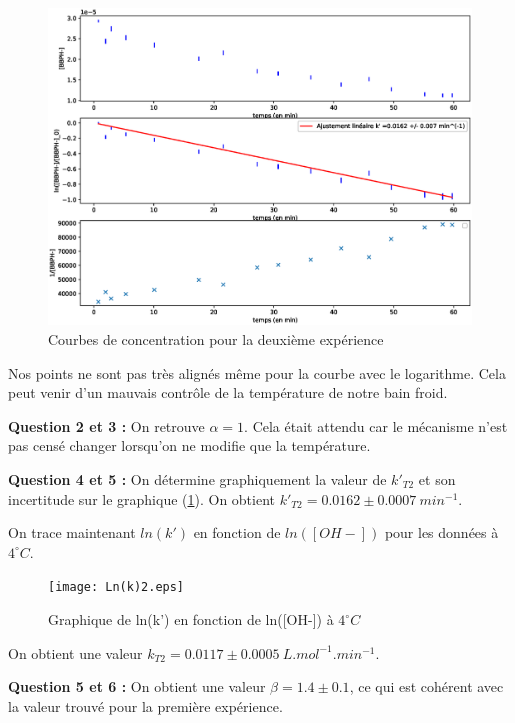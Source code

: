 \documentclass[12pt]{article}
\begin{document}
\begin{figure}[h!]
    \begin{center}
        \includegraphics[scale=0.5]{DeuxièmeCourbesCinétiques.eps}
        \caption{Courbes de concentration pour la deuxième expérience}
        \label{img4:deuxièmexp}
    \end{center}
\end{figure}
Nos points ne sont pas très alignés même pour la courbe avec le logarithme. 
Cela peut venir d'un mauvais contrôle de la température de notre bain froid.

\textbf{Question 2 et 3 :} On retrouve $\alpha =1$. Cela était attendu car le mécanisme n'est pas censé changer lorsqu'on ne modifie que la température.

\textbf{Question 4 et 5 :} On détermine graphiquement la valeur de $k'_{T2}$ et son incertitude sur le graphique (\ref{img4:deuxièmexp}).
On obtient $k'_{T2}=0.0162 \pm 0.0007 \ min^{-1}$.

On trace maintenant $ln(k')$ en fonction de $ln([OH-])$ pour les données à $4^\circ C$.
\begin{figure}[h!]
    \begin{center}
        \texttt{[image: Ln(k)2.eps]}
        \caption{Graphique de ln(k') en fonction de ln([OH-]) à $4^\circ C$} 
        \label{im5:ln4 4 degré}
    \end{center}
\end{figure}

On obtient une valeur $k_{T2}=0.0117 \pm 0.0005 \ L.mol^{-1}.min^{-1}$.

\textbf{Question 5 et 6 :} On obtient une valeur $\beta = 1.4 \pm 0.1$, ce qui est cohérent avec la valeur trouvé pour la première expérience.
\end{document}
